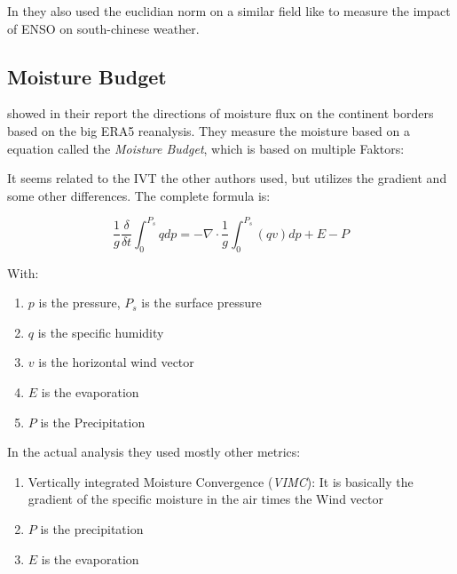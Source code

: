 In \cite{ayantobo_integrated_2022} they also used the euclidian norm on a similar field like \cite{ralph_dropsonde_2017} to measure the impact of  ENSO on south-chinese weather.

\subsection{Moisture Budget}

\citeauthor{yang_moisture_2022} showed in their report \cite{yang_moisture_2022} the directions of moisture flux on the continent borders based on the big ERA5 reanalysis.
They measure the moisture based on a equation called the \textit{Moisture Budget}, which is based on multiple Faktors: 



It seems related to the IVT the other authors used, but utilizes the gradient and some other differences. The complete formula is:

$$
\frac{1}{g} \frac{\delta}{\delta t} \int^{P_s}_0 q dp = - \nabla \cdot \frac{1}{g} \int^{P_s}_0 (qv) dp + E - P
$$

With: 

\begin{enumerate}
  \item $p$ is the pressure, $P_s$ is the surface pressure
  \item $q$ is the specific humidity
  \item $v$ is the horizontal wind vector
  \item $E$ is the evaporation
  \item $P$ is the Precipitation
\end{enumerate}


In the actual analysis they used mostly other metrics:


\begin{enumerate}
  \item Vertically integrated Moisture Convergence (\textit{VIMC}): It is basically the gradient of the specific moisture in the air times the Wind vector
  \item $P$ is the precipitation 
  \item $E$ is the evaporation
\end{enumerate}

